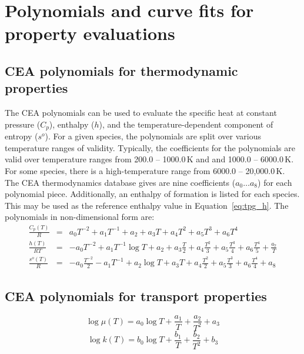 \chapter{Polynomials and curve fits for property evaluations}
\label{chap:poly}

\section{CEA polynomials for thermodynamic properties}
\label{sec:cea-thermo}
The CEA polynomials can be used to evaluate the specific heat
at constant pressure ($C_p$), enthalpy ($h$), and
the temperature-dependent component of entropy ($s^o$).
For a given species, the polynomials are split over various temperature
ranges of validity.
Typically, the coefficients for the polynomials are valid over temperature ranges
from 200.0 -- 1000.0\,K and and 1000.0 -- 6000.0\,K.
For some species, there is a high-temperature range from 6000.0 -- 20,000.0\,K.
The CEA thermodynamics database gives are nine coefficients ($a_0 \ldots a_8$) for each polynomial piece.
Additionally, an enthalpy of formation is listed for each species.
This may be used as the reference enthalpy value in Equation~\ref{eq:tpg_h}.
The polynomials in non-dimensional form are:
\begin{eqnarray}
 \frac{C_p(T)}{R} & = & a_0 T^{-2} + a_1 T^{-1} + a_2 + a_3 T + a_4 T^2 + a_5 T^3 + a_6 T^4 \\
 \frac{h(T)}{RT} & = & -a_0 T^{-2} + a_1 T^{-1} \log{T} + a_2 + a_3 \frac{T}{2} +
                        a_4 \frac{T^2}{3} + a_5 \frac{T^3}{4} + a_6 \frac{T^4}{5} + \frac{a_7}{T} \\
 \frac{s^o(T)}{R} & = & -a_0 \frac{T^{-2}}{2} - a_1 T^{-1} + a_2 \log{T} + a_3 T + a_4 \frac{T^2}{2}  +
                        a_5 \frac{T^{3}}{3} + a_6 \frac{T^4}{4} + a_8
\end{eqnarray}

\section{CEA polynomials for transport properties}
\begin{equation}
\log{\mu(T)}  =  a_0 \log{T} + \frac{a_1}{T} + \frac{a_2}{T^2} + a_3
\end{equation}
\begin{equation}
\log{k(T)} = b_0 \log{T} + \frac{b_1}{T} + \frac{b_2}{T^2} + b_3
\end{equation}

